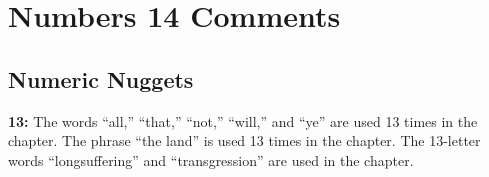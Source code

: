 \section{Numbers 14 Comments}

\subsection{Numeric Nuggets}
\textbf{13: } The words ``all,'' ``that,'' ``not,'' ``will,'' and ``ye'' are used 13 times in the chapter. 
The phrase ``the land'' is used 13 times in the chapter. The 13-letter words ``longsuffering'' and ``transgression'' are used in the chapter.